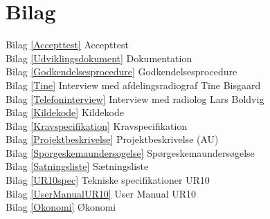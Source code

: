 \chapter{Bilag}\label{kapitel_Bilag}

Bilag \ref{Accepttest} Accepttest \\
Bilag \ref{Udviklingsdokument} Dokumentation\\
Bilag \ref{Godkendelsesprocedure} Godkendelsesprocedure \\
Bilag \ref{Tine} Interview med afdelingsradiograf Tine Bisgaard \\
Bilag \ref{Telefoninterview} Interview med radiolog Lars Boldvig \\
Bilag \ref{Kildekode} Kildekode \\
Bilag \ref{Kravspecifikation} Kravspecifikation \\
Bilag \ref{Projektbeskrivelse} Projektbeskrivelse (AU) \\
Bilag \ref{Sporgeskemaundersogelse} Spørgeskemaundersøgelse\\
Bilag \ref{Satningsliste} Sætningsliste \\
Bilag \ref{UR10spec} Tekniske specifikationer UR10 \\
Bilag \ref{UserManualUR10} User Manual UR10 \\
Bilag \ref{Okonomi} Økonomi \\



